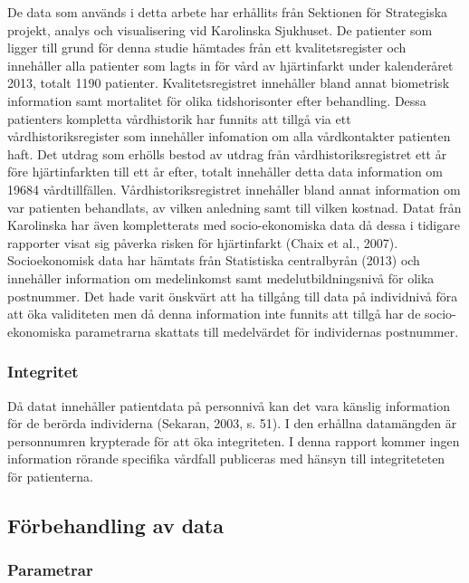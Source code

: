 De data som används i detta arbete har erhållits från Sektionen för Strategiska projekt, analys och visualisering vid Karolinska Sjukhuset. De patienter som ligger till grund för denna studie hämtades från ett kvalitetsregister och innehåller alla patienter som lagts in för vård av hjärtinfarkt under kalenderåret 2013, totalt 1190 patienter. Kvalitetsregistret innehåller bland annat biometrisk information samt mortalitet för olika tidshorisonter efter behandling. Dessa patienters kompletta vårdhistorik har funnits att tillgå via ett vårdhistoriksregister som innehåller infomation om alla vårdkontakter patienten haft. Det utdrag som erhölls bestod av utdrag från vårdhistoriksregistret ett år före hjärtinfarkten till ett år efter, totalt innehåller detta data information om 19684 vårdtillfällen. Vårdhistoriksregistret innehåller bland annat information om var patienten behandlats, av vilken anledning samt till vilken kostnad. Datat från Karolinska har även kompletterats med socio-ekonomiska data då dessa i tidigare rapporter visat sig påverka risken för hjärtinfarkt (Chaix et al., 2007). Socioekonomisk data har hämtats från Statistiska centralbyrån (2013) och innehåller information om medelinkomst samt medelutbildningsnivå för olika postnummer. Det hade varit önskvärt att ha tillgång till data på individnivå föra att öka validiteten men då denna information inte funnits att tillgå har de socio-ekonomiska parametrarna skattats till medelvärdet för individernas postnummer.

\subsubsection{Integritet}

Då datat innehåller patientdata på personnivå kan det vara känslig information för de berörda individerna (Sekaran, 2003, s. 51). I den erhållna datamängden är personnumren krypterade för att öka integriteten. I denna rapport kommer ingen information rörande specifika vårdfall publiceras med hänsyn till integriteteten för patienterna.

\subsection{Förbehandling av data}

\subsubsection{Parametrar}

